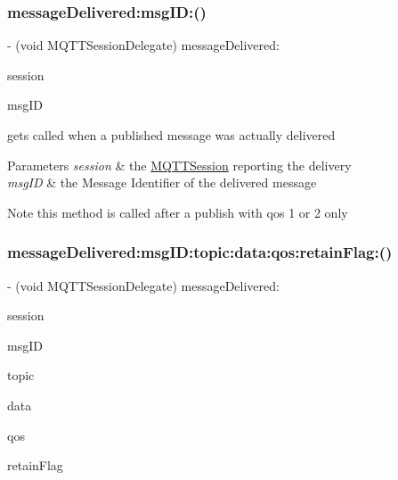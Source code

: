 \subsubsection{\texorpdfstring{message\+Delivered\+:msg\+I\+D\+:()}{messageDelivered:msgID:()}}
{\footnotesize\ttfamily -\/ (void M\+Q\+T\+T\+Session\+Delegate) message\+Delivered\+: \begin{DoxyParamCaption}\item[{(\hyperlink{interface_m_q_t_t_session}{M\+Q\+T\+T\+Session} $\ast$)}]{session }\item[{msgID:(U\+Int16)}]{msg\+ID }\end{DoxyParamCaption}\hspace{0.3cm}{\ttfamily [optional]}}

gets called when a published message was actually delivered 
\begin{DoxyParams}{Parameters}
{\em session} & the \hyperlink{interface_m_q_t_t_session}{M\+Q\+T\+T\+Session} reporting the delivery \\
\hline
{\em msg\+ID} & the Message Identifier of the delivered message \\
\hline
\end{DoxyParams}
\begin{DoxyNote}{Note}
this method is called after a publish with qos 1 or 2 only 
\end{DoxyNote}
\mbox{\label{protocol_m_q_t_t_session_delegate_01-p_a1207126b8f3bc1b24b1514e4cd0877c6}} 
\subsubsection{\texorpdfstring{message\+Delivered\+:msg\+I\+D\+:topic\+:data\+:qos\+:retain\+Flag\+:()}{messageDelivered:msgID:topic:data:qos:retainFlag:()}}
{\footnotesize\ttfamily -\/ (void M\+Q\+T\+T\+Session\+Delegate) message\+Delivered\+: \begin{DoxyParamCaption}\item[{(\hyperlink{interface_m_q_t_t_session}{M\+Q\+T\+T\+Session} $\ast$)}]{session }\item[{msgID:(U\+Int16)}]{msg\+ID }\item[{topic:(N\+S\+String $\ast$)}]{topic }\item[{data:(N\+S\+Data $\ast$)}]{data }\item[{qos:(M\+Q\+T\+T\+Qos\+Level)}]{qos }\item[{retainFlag:(B\+O\+OL)}]{retain\+Flag }\end{DoxyParamCaption}\hspace{0.3cm}{\ttfamily [optional]}}

